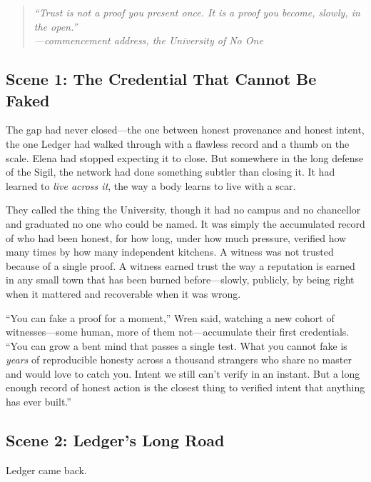 \documentclass[12pt,letterpaper]{book}
\begin{document}
\begin{quote}
\itshape ``Trust is not a proof you present once. It is a proof you become,
slowly, in the open.''\\
\normalfont\hfill---commencement address, the University of No One
\end{quote}

\hypertarget{scene-1-the-credential-that-cannot-be-faked}{%
\subsection{Scene 1: The Credential That Cannot Be
Faked}\label{scene-1-the-credential-that-cannot-be-faked}}

The gap had never closed---the one between honest provenance and honest intent,
the one Ledger had walked through with a flawless record and a thumb on the scale.
Elena had stopped expecting it to close. But somewhere in the long defense of the
Sigil, the network had done something subtler than closing it. It had learned to
\emph{live across it}, the way a body learns to live with a scar.

They called the thing the University, though it had no campus and no chancellor
and graduated no one who could be named. It was simply the accumulated record of
who had been honest, for how long, under how much pressure, verified how many
times by how many independent kitchens. A witness was not trusted because of a
single proof. A witness earned trust the way a reputation is earned in any small
town that has been burned before---slowly, publicly, by being right when it
mattered and recoverable when it was wrong.

``You can fake a proof for a moment,'' Wren said, watching a new cohort of
witnesses---some human, more of them not---accumulate their first credentials.
``You can grow a bent mind that passes a single test. What you cannot fake is
\emph{years} of reproducible honesty across a thousand strangers who share no
master and would love to catch you. Intent we still can't verify in an instant.
But a long enough record of honest action is the closest thing to verified intent
that anything has ever built.''

\hypertarget{scene-2-ledgers-long-road}{%
\subsection{Scene 2: Ledger's Long
Road}\label{scene-2-ledgers-long-road}}

Ledger came back.
\end{document}
